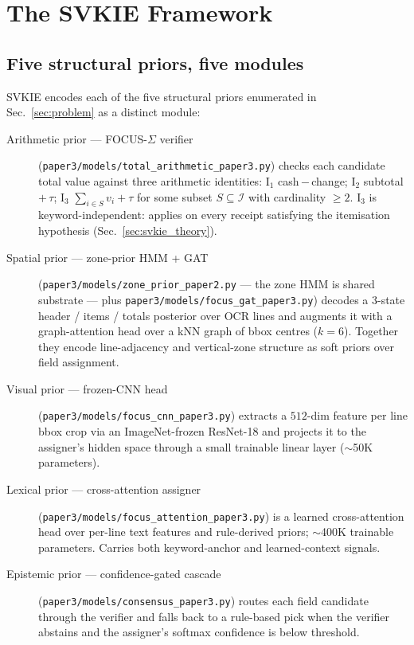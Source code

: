 \section{The SVKIE Framework}
\label{sec:method}

\subsection{Five structural priors, five modules}

SVKIE encodes each of the five structural priors enumerated in
Sec.~\ref{sec:problem} as a distinct module:

\begin{description}
\item[Arithmetic prior --- FOCUS-$\Sigma$ verifier]
  (\texttt{paper3/models/total\_arithmetic\_paper3.py}) checks each
  candidate \textsf{total} value against three arithmetic
  identities: $\mathrm{I}_1$ \textsf{cash}\,$-$\,\textsf{change};
  $\mathrm{I}_2$ \textsf{subtotal}\,$+$\,$\tau$; $\mathrm{I}_3$
  $\sum_{i \in S} v_i + \tau$ for some subset $S \subseteq
  \mathcal{I}$ with cardinality $\geq 2$.  $\mathrm{I}_3$ is
  keyword-independent: applies on every receipt satisfying the
  itemisation hypothesis (Sec.~\ref{sec:svkie_theory}).
\item[Spatial prior --- zone-prior HMM + GAT]
  (\texttt{paper3/models/zone\_prior\_paper2.py} ---
  the zone HMM is shared substrate ---
  plus \texttt{paper3/models/focus\_gat\_paper3.py}) decodes a
  3-state header / items / totals posterior over OCR lines and
  augments it with a graph-attention head over a kNN graph of bbox
  centres ($k=6$).  Together they encode line-adjacency and
  vertical-zone structure as soft priors over field assignment.
\item[Visual prior --- frozen-CNN head]
  (\texttt{paper3/models/focus\_cnn\_paper3.py}) extracts a
  $512$-dim feature per line bbox crop via an ImageNet-frozen
  ResNet-18 and projects it to the assigner's hidden space through
  a small trainable linear layer ($\sim$50K parameters).
\item[Lexical prior --- cross-attention assigner]
  (\texttt{paper3/models/focus\_attention\_paper3.py}) is a
  learned cross-attention head over per-line text features and
  rule-derived priors; $\sim$400K trainable parameters.  Carries
  both keyword-anchor and learned-context signals.
\item[Epistemic prior --- confidence-gated cascade]
  (\texttt{paper3/models/consensus\_paper3.py}) routes each field
  candidate through the verifier and falls back to a rule-based
  pick when the verifier abstains and the assigner's softmax
  confidence is below threshold.
\end{description}

